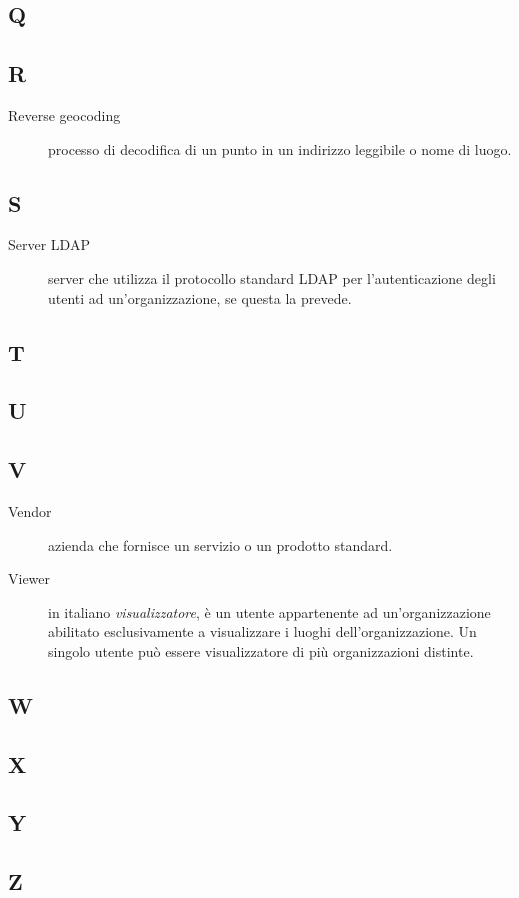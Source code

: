 \documentclass[../../../analisi-dei-requisiti.tex]{subfiles}
\begin{document}
\subsection{Q}

\subsection{R}
\begin{description}
    \item[Reverse geocoding] processo di decodifica di un punto in un indirizzo leggibile o nome di luogo.
\end{description}

\subsection{S}
\begin{description}
    \item[Server LDAP] server che utilizza il protocollo standard LDAP per l'autenticazione degli utenti ad un'organizzazione, se questa la prevede.
\end{description}

\subsection{T}

\subsection{U}

\subsection{V}
\begin{description}
    \item[Vendor] azienda che fornisce un servizio o un prodotto standard.
    \item[Viewer] in italiano \textit{visualizzatore}, è un utente appartenente ad un'organizzazione abilitato esclusivamente a visualizzare i luoghi dell'organizzazione. Un singolo utente può essere visualizzatore di più organizzazioni distinte.  
\end{description}

\subsection{W}

\subsection{X}

\subsection{Y}

\subsection{Z}
\end{document}

